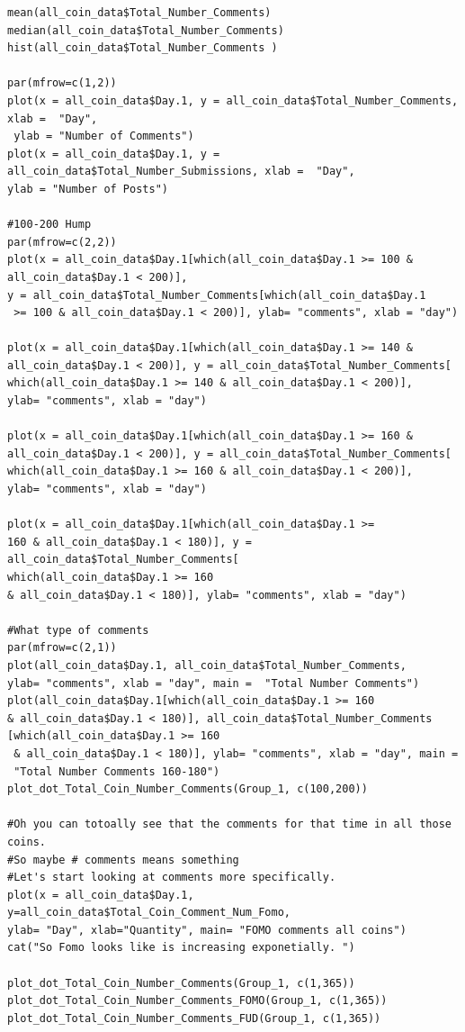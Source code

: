 \documentclass[12pt]{article}
\begin{document}
{\begin{verbatim}
mean(all_coin_data$Total_Number_Comments)
median(all_coin_data$Total_Number_Comments)
hist(all_coin_data$Total_Number_Comments )

par(mfrow=c(1,2))
plot(x = all_coin_data$Day.1, y = all_coin_data$Total_Number_Comments, xlab =  "Day",
 ylab = "Number of Comments")
plot(x = all_coin_data$Day.1, y = all_coin_data$Total_Number_Submissions, xlab =  "Day", 
ylab = "Number of Posts")

#100-200 Hump
par(mfrow=c(2,2))
plot(x = all_coin_data$Day.1[which(all_coin_data$Day.1 >= 100 & all_coin_data$Day.1 < 200)], 
y = all_coin_data$Total_Number_Comments[which(all_coin_data$Day.1
 >= 100 & all_coin_data$Day.1 < 200)], ylab= "comments", xlab = "day")

plot(x = all_coin_data$Day.1[which(all_coin_data$Day.1 >= 140 & 
all_coin_data$Day.1 < 200)], y = all_coin_data$Total_Number_Comments[
which(all_coin_data$Day.1 >= 140 & all_coin_data$Day.1 < 200)], 
ylab= "comments", xlab = "day")

plot(x = all_coin_data$Day.1[which(all_coin_data$Day.1 >= 160 & 
all_coin_data$Day.1 < 200)], y = all_coin_data$Total_Number_Comments[
which(all_coin_data$Day.1 >= 160 & all_coin_data$Day.1 < 200)], 
ylab= "comments", xlab = "day")

plot(x = all_coin_data$Day.1[which(all_coin_data$Day.1 >= 
160 & all_coin_data$Day.1 < 180)], y = all_coin_data$Total_Number_Comments[
which(all_coin_data$Day.1 >= 160 
& all_coin_data$Day.1 < 180)], ylab= "comments", xlab = "day")

#What type of comments
par(mfrow=c(2,1))
plot(all_coin_data$Day.1, all_coin_data$Total_Number_Comments, 
ylab= "comments", xlab = "day", main =  "Total Number Comments")
plot(all_coin_data$Day.1[which(all_coin_data$Day.1 >= 160 
& all_coin_data$Day.1 < 180)], all_coin_data$Total_Number_Comments
[which(all_coin_data$Day.1 >= 160
 & all_coin_data$Day.1 < 180)], ylab= "comments", xlab = "day", main =  
 "Total Number Comments 160-180")
plot_dot_Total_Coin_Number_Comments(Group_1, c(100,200))

#Oh you can totoally see that the comments for that time in all those coins. 
#So maybe # comments means something
#Let's start looking at comments more specifically.
plot(x = all_coin_data$Day.1, y=all_coin_data$Total_Coin_Comment_Num_Fomo, 
ylab= "Day", xlab="Quantity", main= "FOMO comments all coins")
cat("So Fomo looks like is increasing exponetially. ")

plot_dot_Total_Coin_Number_Comments(Group_1, c(1,365))
plot_dot_Total_Coin_Number_Comments_FOMO(Group_1, c(1,365))
plot_dot_Total_Coin_Number_Comments_FUD(Group_1, c(1,365))


\end{verbatim}}
\end{document}
